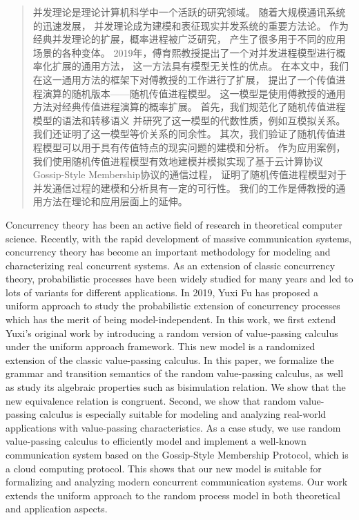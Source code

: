 
\begin{abstract}
  并发理论是理论计算机科学中一个活跃的研究领域。
  随着大规模通讯系统的迅速发展，
  并发理论成为建模和表征现实并发系统的重要方法论。
  作为经典并发理论的扩展，概率进程被广泛研究，
  产生了很多用于不同的应用场景的各种变体。
  2019年，傅育熙教授提出了一个对并发进程模型进行概率化扩展的通用方法，
  这一方法具有模型无关性的优点。
  在本文中，我们在这一通用方法的框架下对傅教授的工作进行了扩展，
  提出了一个传值进程演算的随机版本——随机传值进程模型。
  这一模型是使用傅教授的通用方法对经典传值进程演算的概率扩展。
  首先，我们规范化了随机传值进程模型的语法和转移语义
  并研究了这一模型的代数性质，例如互模拟关系。
  我们还证明了这一模型等价关系的同余性。
  其次，我们验证了随机传值进程模型可以用于具有传值特点的现实问题的建模和分析。
  作为应用案例，
  我们使用随机传值进程模型有效地建模并模拟实现了基于云计算协议Gossip-Style Membership协议的通信过程，
  证明了随机传值进程模型对于并发通信过程的建模和分析具有一定的可行性。
  我们的工作是傅教授的通用方法在理论和应用层面上的延伸。
\end{abstract}

\begin{abstract*}
  Concurrency theory has been an active field of research in theoretical computer science.
   Recently, with the rapid development of massive communication systems, concurrency theory has become an important methodology for modeling and characterizing real concurrent systems. 
   As an extension of classic concurrency theory, probabilistic processes have been widely studied for many years and led to lots of variants for different applications. 
   In 2019, Yuxi Fu has proposed a uniform approach to study the probabilistic extension of concurrency processes 
   which has the merit of being model-independent. 
   In this work, we first extend Yuxi's original work by introducing a random version of value-passing calculus under the uniform approach framework.
  This new model is a randomized extension of the classic value-passing calculus.
   In this paper, we formalize the grammar and transition semantics of the random value-passing calculus, 
   as well as study its algebraic properties such as bisimulation relation. 
   We show that the new equivalence relation is congruent. 
   Second, we show that random value-passing calculus is especially suitable for modeling and analyzing real-world applications with value-passing characteristics. 
   As a case study, we use random value-passing calculus to efficiently model and implement a well-known communication system based on the Gossip-Style Membership Protocol, which is a cloud computing protocol. 
   This shows that our new model is suitable for formalizing and analyzing modern concurrent communication systems.
    Our work extends the uniform approach to the random process model in both theoretical and application aspects.

\end{abstract*}
